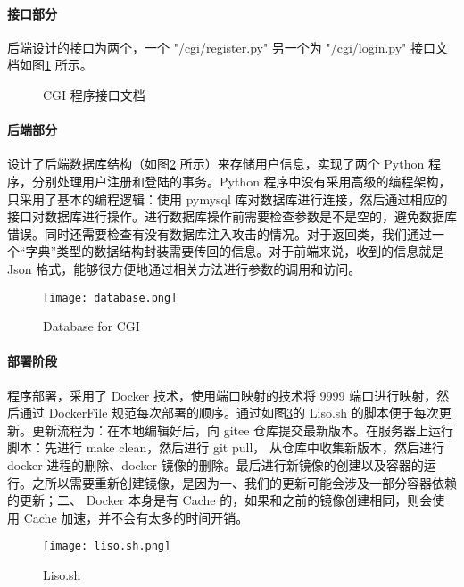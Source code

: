 \paragraph*{接口部分} 后端设计的接口为两个，一个 "/cgi/register.py" 另一个为 "/cgi/login.py" 接口文档如图\ref{fig:CGIPORT} 所示。

\begin{figure}[htbp!]
    \centering
    \caption{CGI 程序接口文档} \label{fig:CGIPORT}
\end{figure}


\paragraph*{后端部分} 设计了后端数据库结构（如图\ref{fig:database} 所示）来存储用户信息，实现了两个 Python 程序，分别处理用户注册和登陆的事务。Python 程序中没有采用高级的编程架构，只采用了基本的编程逻辑：使用 pymysql 库对数据库进行连接，然后通过相应的接口对数据库进行操作。进行数据库操作前需要检查参数是不是空的，避免数据库错误。同时还需要检查有没有数据库注入攻击的情况。对于返回类，我们通过一个“字典”类型的数据结构封装需要传回的信息。对于前端来说，收到的信息就是 Json 格式，能够很方便地通过相关方法进行参数的调用和访问。

\begin{figure}[htbp!]
    \centering
    \texttt{[image: database.png]}
    \caption{Database for CGI}\label{fig:database}
\end{figure}

\paragraph*{部署阶段} 程序部署，采用了 Docker 技术，使用端口映射的技术将 9999 端口进行映射，然后通过 DockerFile 规范每次部署的顺序。通过如图\ref{fig:Liso.sh}的 Liso.sh 的脚本便于每次更新。更新流程为：在本地编辑好后，向 gitee 仓库提交最新版本。在服务器上运行脚本：先进行 make clean，然后进行 git pull， 从仓库中收集新版本，然后进行 docker 进程的删除、docker 镜像的删除。最后进行新镜像的创建以及容器的运行。之所以需要重新创建镜像，是因为一、我们的更新可能会涉及一部分容器依赖的更新；二、 Docker 本身是有 Cache 的，如果和之前的镜像创建相同，则会使用 Cache 加速，并不会有太多的时间开销。

\begin{figure}[htbp!]
    \begin{center}
        \texttt{[image: liso.sh.png]}
        \caption{Liso.sh}\label{fig:Liso.sh}
    \end{center}
\end{figure}

